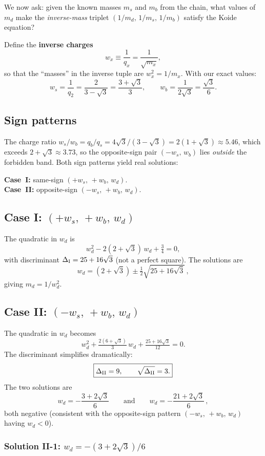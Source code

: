 \documentclass[11pt]{article}
\begin{document}
We now ask: given the known masses $m_s$ and $m_b$ from the chain,
what values of $m_d$ make the \emph{inverse-mass} triplet
$(1/m_d,\,1/m_s,\,1/m_b)$ satisfy the Koide equation?

Define the \textbf{inverse charges}
\[
  w_x \equiv \frac{1}{q_x} = \frac{1}{\sqrt{m_x}},
\]
so that the ``masses'' in the inverse tuple are $w_x^2 = 1/m_x$.
With our exact values:
\[
  w_s = \frac{1}{q_2} = \frac{2}{3-\sqrt3} = \frac{3+\sqrt3}{3},
  \qquad
  w_b = \frac{1}{2\sqrt3} = \frac{\sqrt3}{6}.
\]

\subsection{Sign patterns}

The charge ratio $w_s/w_b = q_b/q_s = 4\sqrt{3}/(3-\sqrt3) = 2(1+\sqrt3) \approx 5.46$,
which exceeds $2+\sqrt3\approx 3.73$, so the opposite-sign pair $(-w_s,\,w_b)$
lies \emph{outside} the forbidden band. Both sign patterns yield real solutions:

\medskip\noindent
\textbf{Case~I:} same-sign $(+w_s,\,+w_b,\,w_d)$.\\
\textbf{Case~II:} opposite-sign $(-w_s,\,+w_b,\,w_d)$.

\subsection{Case I: $(+w_s,\,+w_b,\,w_d)$}

The quadratic in $w_d$ is
\[
  w_d^2 - 2(2+\sqrt3)\,w_d + \tfrac{3}{4} = 0,
\]
with discriminant $\Delta_{\rm I} = 25 + 16\sqrt{3}$
(not a perfect square).  The solutions are
\[
  w_d = (2+\sqrt3) \pm \tfrac{1}{2}\sqrt{25+16\sqrt3}\,,
\]
giving $m_d = 1/w_d^2$.

\subsection{Case II: $(-w_s,\,+w_b,\,w_d)$}

The quadratic in $w_d$ becomes
\[
  w_d^2 + \tfrac{2(6+\sqrt3)}{3}\,w_d + \tfrac{25+16\sqrt3}{12} = 0.
\]
The discriminant simplifies dramatically:
\[
  \boxed{\Delta_{\rm II} = 9, \qquad \sqrt{\Delta_{\rm II}} = 3.}
\]
The two solutions are
\[
  w_d = -\frac{3+2\sqrt3}{6}
  \qquad\text{and}\qquad
  w_d = -\frac{21+2\sqrt3}{6}\,,
\]
both negative (consistent with the opposite-sign pattern
$(-w_s,\,+w_b,\,w_d)$ having $w_d < 0$).

\subsubsection{Solution II-1: $w_d = -(3+2\sqrt3)/6$}
\end{document}
